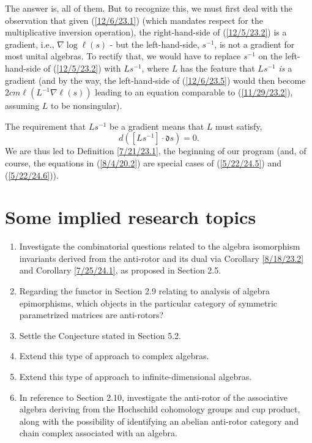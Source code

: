 \documentclass{amsart}
\numberwithin{equation}{section}
\theoremstyle{definition}
\numberwithin{theorem}{section}
\begin{document}
The answer is, all of them.  But to recognize this, we must first deal with the observation that given (\ref{12/6/23.1}) (which mandates respect for the multiplicative inversion operation), the right-hand-side of (\ref{12/5/23.2}) is a gradient, i.e., $\nabla\log \ell(s)$ - but the left-hand-side, $s^{-1}$, is not a gradient for most unital algebras.  
To rectify that, we would have to replace $s^{-1}$ on the left-hand-side of (\ref{12/5/23.2}) with $Ls^{-1}$, where $L$ has the feature that $Ls^{-1}$ {\it is} a gradient (and by the way, the left-hand-side of (\ref{12/6/23.5}) would then become $ {2cm} \ell(L^{-1}\nabla\ell(s))$ leading to an equation comparable to  (\ref{11/29/23.2}), assuming $L$ to be nonsingular).   


The requirement that $Ls^{-1}$ be a gradient means that $L$ must satisfy, \[ d([Ls^{-1}]\cdot \mathfrak{d}s) = 0.\]  We are thus led to Definition \ref{7/21/23.1}, the beginning of our program (and, of course, the equations in (\ref{8/4/20.2}) are special cases of (\ref{5/22/24.5}) and (\ref{5/22/24.6})).

\vspace{.5cm} 

\section{Some implied research topics} 
\begin{enumerate} \item Investigate the combinatorial questions related to the algebra isomorphism invariants derived from the anti-rotor and its dual via Corollary \ref{8/18/23.2} and Corollary \ref{7/25/24.1}, as proposed in Section 2.5.  \item Regarding the functor in Section 2.9 relating to analysis of algebra epimorphisms, which objects in the particular category of symmetric parametrized matrices are anti-rotors? \item Settle the Conjecture stated in Section 5.2. \item Extend this type of approach to complex algebras. \item Extend this type of approach to infinite-dimensional algebras. \item In reference to Section 2.10, investigate the anti-rotor of the associative algebra deriving from the Hochschild cohomology groups and cup product, along with the possibility of identifying an abelian anti-rotor category and chain complex associated with an algebra.    \end{enumerate}
  
\end{document}
